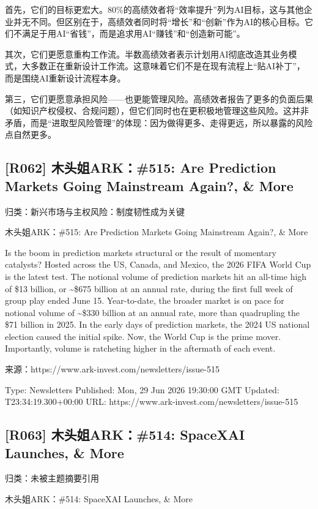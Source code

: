 \documentclass[11pt]{ctexart}
\begin{document}
首先，它们的目标更宏大。80\%的高绩效者将“效率提升”列为AI目标，这与其他企业并无不同。但区别在于，高绩效者同时将“增长”和“创新”作为AI的核心目标。它们不满足于用AI“省钱”，而是追求用AI“赚钱”和“创造新可能”。

其次，它们更愿意重构工作流。半数高绩效者表示计划用AI彻底改造其业务模式，大多数正在重新设计工作流。这意味着它们不是在现有流程上“贴AI补丁”，而是围绕AI重新设计流程本身。

第三，它们更愿意承担风险——也更能管理风险。高绩效者报告了更多的负面后果（如知识产权侵权、合规问题），但它们同时也在更积极地管理这些风险。这并非矛盾，而是“进取型风险管理”的体现：因为做得更多、走得更远，所以暴露的风险点自然更多。

\subsection{[R062] 木头姐ARK：\#515: Are Prediction Markets Going Mainstream Again?, \& More}
{\small\color{refgray}归类：新兴市场与主权风险：制度韧性成为关键}

木头姐ARK：\#515: Are Prediction Markets Going Mainstream Again?, \& More

Is the boom in prediction markets structural or the result of momentary catalysts? Hosted across the US, Canada, and Mexico, the 2026 FIFA World Cup is the latest test. The notional volume of prediction markets hit an all-time high of \$13 billion, or \textasciitilde{}\$675 billion at an annual rate, during the first full week of group play ended June 15. Year-to-date, the broader market is on pace for notional volume of \textasciitilde{}\$330 billion at an annual rate, more than quadrupling the \$71 billion in 2025. In the early days of prediction markets, the 2024 US national election caused the initial spike. Now, the World Cup is the prime mover. Importantly, volume is ratcheting higher in the aftermath of each event.

来源：https://www.ark-invest.com/newsletters/issue-515

Type: Newsletters Published: Mon, 29 Jun 2026 19:30:00 GMT Updated: T23:34:19.300+00:00 URL: https://www.ark-invest.com/newsletters/issue-515

\subsection{[R063] 木头姐ARK：\#514: SpaceXAI Launches, \& More}
{\small\color{refgray}归类：未被主题摘要引用}

木头姐ARK：\#514: SpaceXAI Launches, \& More
\end{document}
